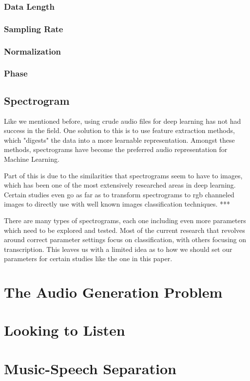 \documentclass{book}
\begin{document}
\subsection{Data Length}
\subsection{Sampling Rate}
\subsection{Normalization}
\subsection{Phase}
\section{Spectrogram}
\par
Like we mentioned before, using crude audio files for deep learning has not had success in the field.
One solution to this is to use feature extraction methods, which "digests" the data into a more learnable representation.
Amongst these methods, spectrograms have become the preferred audio representation for Machine Learning.
\par
Part of this is due to the similarities that spectrograms seem to have to images, which has been one of the most extensively researched areas in deep learning.
Certain studies even go as far as to transform spectrograms to rgb channeled images to directly use with well known images classification techniques. *** %
\par
There are many types of spectrograms, each one including even more parameters which need to be explored and tested.
Most of the current research that revolves around correct parameter settings focus on classification, with others focusing on transcription.
This leaves us with a limited idea as to how we should set our parameters for certain studies like the one in this paper.
\par
\chapter{The Audio Generation Problem}
\chapter{Looking to Listen}
\chapter{Music-Speech Separation}
\end{document}
